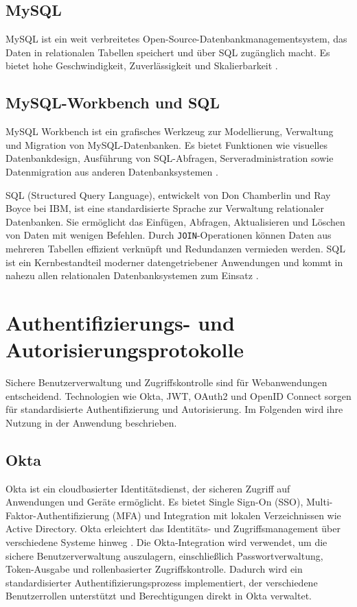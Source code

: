 \subsection{MySQL}
MySQL ist ein weit verbreitetes Open-Source-Datenbankmanagementsystem, das Daten in relationalen Tabellen speichert und über SQL zugänglich macht. Es bietet hohe Geschwindigkeit, Zuverlässigkeit und Skalierbarkeit \cite{ORACLE2025b}.

\subsection{MySQL-Workbench und SQL}
MySQL Workbench ist ein grafisches Werkzeug zur Modellierung, Verwaltung und Migration von MySQL-Datenbanken. Es bietet Funktionen wie visuelles Datenbankdesign, Ausführung von SQL-Abfragen, Serveradministration sowie Datenmigration aus anderen Datenbanksystemen \cite{ORACLE2025d}. 

\noindent SQL (Structured Query Language), entwickelt von Don Chamberlin und Ray Boyce bei IBM, ist eine standardisierte Sprache zur Verwaltung relationaler Datenbanken. Sie ermöglicht das Einfügen, Abfragen, Aktualisieren und Löschen von Daten mit wenigen Befehlen. Durch \texttt{JOIN}-Operationen können Daten aus mehreren Tabellen effizient verknüpft und Redundanzen vermieden werden. SQL ist ein Kernbestandteil moderner datengetriebener Anwendungen und kommt in nahezu allen relationalen Datenbanksystemen zum Einsatz \cite{IBM2025}. 

\section{Authentifizierungs- und Autorisierungsprotokolle}

Sichere Benutzerverwaltung und Zugriffskontrolle sind für Webanwendungen entscheidend. Technologien wie Okta, JWT, OAuth2 und OpenID Connect sorgen für standardisierte Authentifizierung und Autorisierung. Im Folgenden wird ihre Nutzung in der Anwendung beschrieben.

\subsection{Okta}
Okta ist ein cloudbasierter Identitätsdienst, der sicheren Zugriff auf Anwendungen und Geräte ermöglicht. Es bietet Single Sign-On (SSO), Multi-Faktor-Authentifizierung (MFA) und Integration mit lokalen Verzeichnissen wie Active Directory. Okta erleichtert das Identitäts- und Zugriffsmanagement über verschiedene Systeme hinweg \cite{OKTA2025}. Die Okta-Integration wird verwendet, um die sichere Benutzerverwaltung auszulagern, einschließlich Passwortverwaltung, Token-Ausgabe und rollenbasierter Zugriffskontrolle. Dadurch wird ein standardisierter Authentifizierungsprozess implementiert, der verschiedene Benutzerrollen unterstützt und Berechtigungen direkt in Okta verwaltet.

